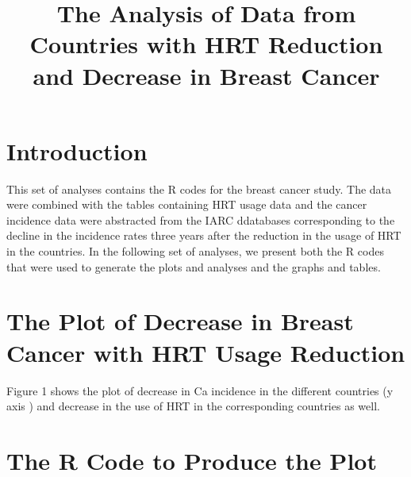 \documentclass{article}
\title{The Analysis of Data from Countries with HRT Reduction and Decrease in Breast Cancer}
\begin{document}
\maketitle

\section*{Introduction}

This set of analyses contains the R codes for the breast cancer study. The data were combined with the tables containing HRT usage data and the cancer incidence data were abstracted from the IARC ddatabases corresponding to the decline in the incidence rates three years after the reduction in the usage of HRT in the countries. In the following set of analyses, we present both the R codes that were used to generate the plots and analyses and the graphs and tables. 

\section*{ The Plot of Decrease in Breast Cancer with HRT Usage Reduction}

Figure 1 shows the plot of decrease in Ca incidence in the different countries (y axis ) and decrease in the use of HRT in the corresponding countries as well. 

\section*{The R Code to Produce the Plot}
\end{document}
